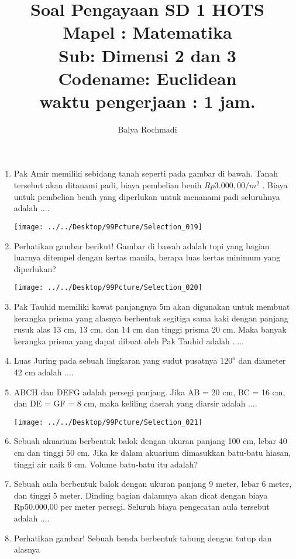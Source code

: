 \documentclass[12pt,a4paper,draft,final,oneside,twoside,openright,openany]{article}
\author{Balya Rochmadi}
\title{Soal Pengayaan SD 1 HOTS\\ Mapel : Matematika\\ Sub: Dimensi 2 dan 3 \\Codename: Euclidean\\ \small waktu pengerjaan : 1 jam.}
\begin{document}
	\maketitle
	\Large
	\begin{enumerate}
		\item Pak Amir memiliki sebidang tanah seperti pada gambar di bawah.
		Tanah tersebut akan ditanami padi, biaya
		pembelian benih $Rp3.000,00/m^2$ .
		Biaya untuk pembelian benih yang
		diperlukan untuk menanami
		padi seluruhnya adalah ....
		\begin{center}
		\texttt{[image: ../../Desktop/99Pcture/Selection\_019]}
		\end{center}
		\item Perhatikan gambar berikut!
		Gambar di bawah adalah topi yang bagian
		luarnya ditempel dengan kertas manila,
		berapa luas kertas minimum yang diperlukan?
		\begin{center}
			\texttt{[image: ../../Desktop/99Pcture/Selection\_020]}
		\end{center}
		\item Pak Tauhid memiliki kawat panjangnya 5m akan digunakan untuk membuat kerangka prisma
		yang alasnya berbentuk segitiga sama kaki dengan panjang rusuk alas 13 cm, 13 cm, dan 14 cm
		dan tinggi prisma 20 cm. Maka banyak kerangka prisma yang dapat dibuat oleh Pak Tauhid
		adalah .....
		\item Luas Juring pada sebuah lingkaran yang sudut pusatnya $120^o$ dan diameter 42 cm
		adalah ....
		\item ABCH dan DEFG adalah persegi panjang.
		Jika AB = 20 cm, BC = 16 cm, dan DE = GF = 8 cm,
		maka keliling daerah yang diarsir adalah ....
			\begin{center}
				\texttt{[image: ../../Desktop/99Pcture/Selection\_021]}
			\end{center}
		\item Sebuah akuarium berbentuk balok dengan ukuran panjang 100 cm, lebar 40 cm dan tinggi 50 cm.
		Jika ke dalam akuarium dimasukkan batu-batu hiasan, tinggi air naik 6 cm. Volume batu-batu itu adalah?
		\item Sebuah aula berbentuk balok dengan ukuran panjang 9 meter, lebar 6 meter, dan tinggi 5 meter.
		Dinding bagian dalamnya akan dicat dengan biaya Rp50.000,00 per meter persegi. Seluruh biaya
		pengecatan aula tersebut adalah ....
		\item Perhatikan gambar! Sebuah benda
		berbentuk tabung dengan tutup dan alasnya

\end{enumerate}
\end{document}
